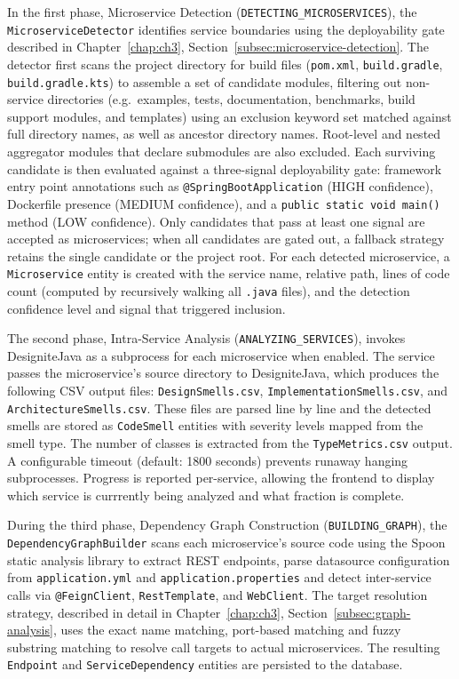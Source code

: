 In the first phase, Microservice Detection (\texttt{DETECTING\_MICROSERVICES}), the \texttt{MicroserviceDetector} identifies service boundaries using the deployability gate described in Chapter~\ref{chap:ch3}, Section~\ref{subsec:microservice-detection}. The detector first scans the project directory for build files (\texttt{pom.xml}, \texttt{build.gradle}, \texttt{build.gradle.kts}) to assemble a set of candidate modules, filtering out non-service directories (e.g.\ examples, tests, documentation, benchmarks, build support modules, and templates) using an exclusion keyword set matched against full directory names, as well as ancestor directory names. Root-level and nested aggregator modules that declare submodules are also excluded. Each surviving candidate is then evaluated against a three-signal deployability gate: framework entry point annotations such as \texttt{@SpringBootApplication} (HIGH confidence), Dockerfile presence (MEDIUM confidence), and a \texttt{public static void main()} method (LOW confidence). Only candidates that pass at least one signal are accepted as microservices; when all candidates are gated out, a fallback strategy retains the single candidate or the project root. For each detected microservice, a \texttt{Microservice} entity is created with the service name, relative path, lines of code count (computed by recursively walking all \texttt{.java} files), and the detection confidence level and signal that triggered inclusion.

The second phase, Intra-Service Analysis (\texttt{ANALYZING\_SERVICES}), invokes DesigniteJava as a subprocess for each microservice when enabled. The service passes the microservice's source directory to DesigniteJava, which produces the following CSV output files: \texttt{DesignSmells.csv}, \texttt{ImplementationSmells.csv}, and \texttt{ArchitectureSmells.csv}.
These files are parsed line by line and the detected smells are stored as \texttt{CodeSmell} entities with severity levels mapped from the smell type. The number of classes is extracted from the \texttt{TypeMetrics.csv} output. A configurable timeout (default: 1800 seconds) prevents runaway hanging subprocesses. Progress is reported per-service, allowing the frontend to display which service is currrently being analyzed and what fraction is complete.

During the third phase, Dependency Graph Construction (\texttt{BUILDING\_GRAPH}), the \texttt{DependencyGraphBuilder} scans each microservice's source code using the Spoon static analysis library \cite{Pawlak2016} to extract REST endpoints, parse datasource configuration from \texttt{application.yml} and \texttt{application.properties} and detect inter-service calls via \texttt{@FeignClient}, \texttt{RestTemplate}, and \texttt{WebClient}. The target resolution strategy, described in detail in Chapter~\ref{chap:ch3}, Section~\ref{subsec:graph-analysis}, uses the exact name matching, port-based matching and fuzzy substring matching to resolve call targets to actual microservices. The resulting \texttt{Endpoint} and \texttt{Ser\-viceDe\-pen\-den\-cy} entities are persisted to the database.

